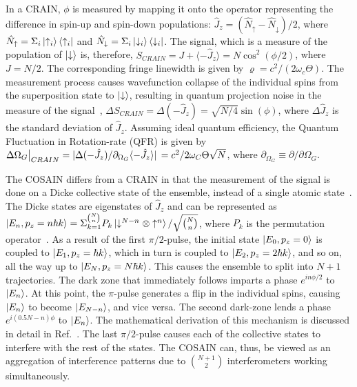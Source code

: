 \documentclass[aps,pra,letterpaper,superscriptaddress,showpacs,amsmath,floats,twocolumn]{revtex4-1}
\begin{document}
In a CRAIN, $\phi$ is measured by mapping it onto the operator representing the difference in spin-up and spin-down populations: $\hat{J}_z = (\hat{N}_{\uparrow} -\hat{N}_{\downarrow})/2$, where $\hat{N}_{\uparrow} = \Sigma_i\ket{\uparrow_i}\bra{\uparrow_i}$ and $\hat{N}_{\downarrow} = \Sigma_i\ket{\downarrow_i}\bra{\downarrow_i}$. The signal, which is a measure of the population of $\ket{\downarrow}$ is, therefore, $S_{CRAIN} = J + \langle - \hat{J}_z \rangle = N\cos^{2}(\phi/2)$, where $J = N/2$. The corresponding fringe linewidth is given by $\varrho=c^2/(2\omega_c\Theta)$. The measurement process causes wavefunction collapse of the individual spins from the superposition state to $\ket{\downarrow}$, resulting in quantum projection noise in the measure of the signal~\cite{Wineland3}, $\Delta S_{CRAIN} = \Delta (-\hat{J}_z)=\sqrt{N/4}\sin(\phi)$, where $\Delta \hat{J}_z$ is the standard deviation of $\hat{J}_z$. Assuming ideal quantum efficiency, the Quantum Fluctuation in Rotation-rate (QFR) is given by $\Delta \Omega_G\bigr|_{CRAIN}=\abs*{\Delta (-\hat{J}_z)/\partial_{\Omega_G} \langle -\hat{J}_z \rangle }= c^2/2\omega_C\Theta\sqrt{N}$, where $\partial_{\Omega_G}\equiv \partial/\partial \Omega_G$.

The COSAIN differs from a CRAIN in that the measurement of the signal is done on a Dicke collective state of the ensemble, instead of a single atomic state~\cite{COSAIN}. The Dicke states are eigenstates of $\hat{J}_z$ and can be represented as $\ket{E_n, p_z = n\hbar k} = \Sigma_{k=1}^{N \choose n}P_k\ket{\downarrow^{N-n}\otimes\uparrow^n}/\sqrt{N \choose n}$, where $P_k$ is the permutation operator~\cite{CollectiveDescription}. As a result of the first $\pi/2$-pulse, the initial state $\ket{E_0, p_z = 0}$ is coupled to $\ket{E_1, p_z = \hbar k}$, which in turn is coupled to $\ket{E_2, p_z = 2\hbar k}$, and so on, all the way up to $\ket{E_N, p_z = N\hbar k}$. This causes the ensemble to split into $N+1$ trajectories. The dark zone that immediately follows imparts a phase $e^{in\phi/2}$ to $\ket{E_n}$. At this point, the $\pi$-pulse generates a flip in the individual spins, causing $\ket{E_n}$ to become $\ket{E_{N-n}}$, and vice versa. The second dark-zone lends a phase $e^{i(0.5N-n)\phi}$ to $\ket{E_n}$. The mathematical derivation of this mechanism is discussed in detail in Ref.~\cite{COSAIN}. The last $\pi/2$-pulse causes each of the collective states to interfere with the rest of the states. The COSAIN can, thus, be viewed as an aggregation of interference patterns due to ${N+1}\choose 2$ interferometers working simultaneously. 
\end{document}
